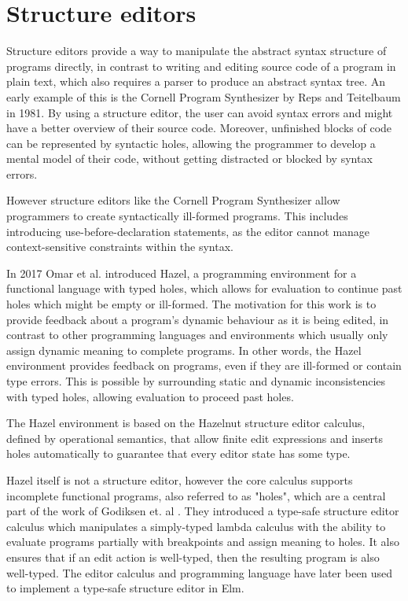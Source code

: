 \section{Structure editors}
Structure editors provide a way to manipulate the abstract syntax structure of programs directly, in contrast to writing and editing source code of a program in plain text, which also requires a parser to produce an abstract syntax tree. An early example of this is the Cornell Program Synthesizer by Reps and Teitelbaum\cite{timtom81} in 1981.
By using a structure editor, the user can avoid syntax errors and might have a better overview of their source code. Moreover, unfinished blocks of code can be represented by syntactic holes, allowing the programmer to develop a mental model of their code, without getting distracted or blocked by syntax errors.

However structure editors like the Cornell Program Synthesizer\cite{timtom81} allow programmers to create syntactically ill-formed programs. This includes introducing use-before-declaration statements, as the editor cannot manage context-sensitive constraints within the syntax.

In 2017 Omar et al. introduced Hazel\cite{omar}, a programming environment for a functional language with typed holes, which allows for evaluation to continue past holes which might be empty or ill-formed. The motivation for this work is to provide feedback about a program's dynamic behaviour as it is being edited, in contrast to other programming languages and environments which usually only assign dynamic meaning to complete programs. In other words, the Hazel environment\cite{omar} provides feedback on programs, even if they are ill-formed or contain type errors. This is possible by surrounding static and dynamic inconsistencies with typed holes, allowing evaluation to proceed past holes.

The Hazel environment is based on the Hazelnut structure editor calculus, defined by operational semantics, that allow finite edit expressions and inserts holes automatically to guarantee that every editor state has some type.

Hazel itself is not a structure editor, however the core calculus supports incomplete functional programs, also referred to as "holes", which are a central part of the work of Godiksen et. al \cite{godiksen}. They introduced a type-safe structure editor calculus which manipulates a simply-typed lambda calculus with the ability to evaluate programs partially with breakpoints and assign meaning to holes. It also ensures that if an edit action is well-typed, then the resulting program is also well-typed. The editor calculus and programming language have later been used to implement a type-safe structure editor in Elm\cite{KU-bach-missing-ref}.

